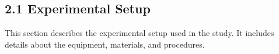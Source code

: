 \subsection{2.1 Experimental Setup}

This section describes the experimental setup used in the study. It includes details about the equipment, materials, and procedures.